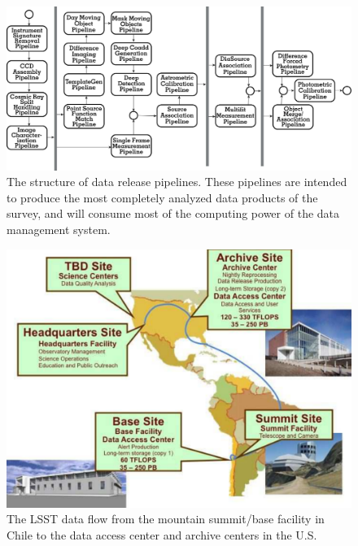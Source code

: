 \documentclass{emulateapj}
\begin{document}
\begin{figure}[t!]
\hskip 0.3in
\includegraphics[width=0.92\hsize,clip]{DMp3.pdf}
\caption{The structure of data release pipelines.
These pipelines are intended to produce the most completely analyzed data products 
of the survey, and will consume most of the computing power of the data management 
system.} 
\label{Fig:DM6}
\end{figure}


\begin{figure}
\hskip 0.5in
\includegraphics[width=0.9\hsize,clip]{DMX2.pdf}
\caption{The LSST data flow from the mountain summit/base facility in
Chile to the data access center and archive centers in the U.S.} 
\label{Fig:DM2}
\end{figure}
\end{document}
